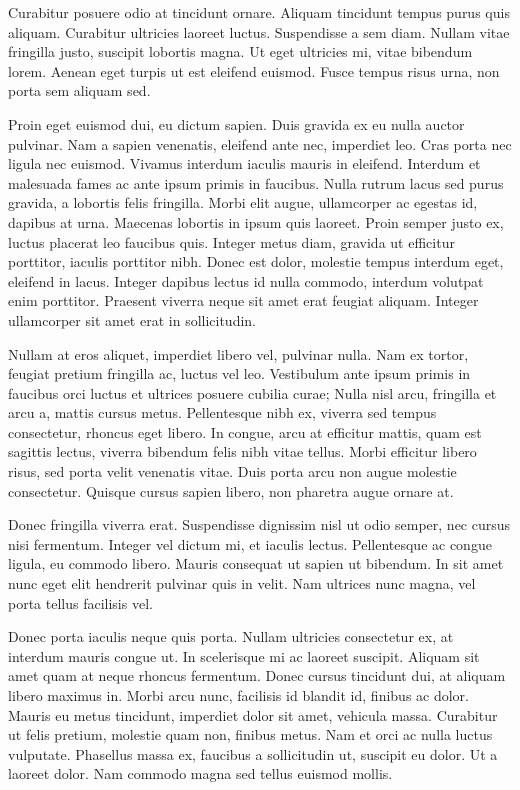 Curabitur posuere odio at tincidunt ornare. Aliquam tincidunt tempus purus quis
aliquam. Curabitur ultricies laoreet luctus. Suspendisse a sem diam. Nullam
vitae fringilla justo, suscipit lobortis magna. Ut eget ultricies mi, vitae
bibendum lorem. Aenean eget turpis ut est eleifend euismod. Fusce tempus risus
urna, non porta sem aliquam sed.

Proin eget euismod dui, eu dictum sapien. Duis gravida ex eu nulla auctor
pulvinar. Nam a sapien venenatis, eleifend ante nec, imperdiet leo. Cras porta
nec ligula nec euismod. Vivamus interdum iaculis mauris in eleifend. Interdum
et malesuada fames ac ante ipsum primis in faucibus. Nulla rutrum lacus sed
purus gravida, a lobortis felis fringilla. Morbi elit augue, ullamcorper ac
egestas id, dapibus at urna. Maecenas lobortis in ipsum quis laoreet. Proin
semper justo ex, luctus placerat leo faucibus quis. Integer metus diam, gravida
ut efficitur porttitor, iaculis porttitor nibh. Donec est dolor, molestie
tempus interdum eget, eleifend in lacus. Integer dapibus lectus id nulla
commodo, interdum volutpat enim porttitor. Praesent viverra neque sit amet erat
feugiat aliquam. Integer ullamcorper sit amet erat in sollicitudin.

Nullam at eros aliquet, imperdiet libero vel, pulvinar nulla. Nam ex tortor,
feugiat pretium fringilla ac, luctus vel leo. Vestibulum ante ipsum primis in
faucibus orci luctus et ultrices posuere cubilia curae; Nulla nisl arcu,
fringilla et arcu a, mattis cursus metus. Pellentesque nibh ex, viverra sed
tempus consectetur, rhoncus eget libero. In congue, arcu at efficitur mattis,
quam est sagittis lectus, viverra bibendum felis nibh vitae tellus. Morbi
efficitur libero risus, sed porta velit venenatis vitae. Duis porta arcu non
augue molestie consectetur. Quisque cursus sapien libero, non pharetra augue
ornare at.

Donec fringilla viverra erat. Suspendisse dignissim nisl ut odio semper, nec
cursus nisi fermentum. Integer vel dictum mi, et iaculis lectus. Pellentesque
ac congue ligula, eu commodo libero. Mauris consequat ut sapien ut bibendum. In
sit amet nunc eget elit hendrerit pulvinar quis in velit. Nam ultrices nunc
magna, vel porta tellus facilisis vel.

Donec porta iaculis neque quis porta. Nullam ultricies consectetur ex, at
interdum mauris congue ut. In scelerisque mi ac laoreet suscipit. Aliquam sit
amet quam at neque rhoncus fermentum. Donec cursus tincidunt dui, at aliquam
libero maximus in. Morbi arcu nunc, facilisis id blandit id, finibus ac dolor.
Mauris eu metus tincidunt, imperdiet dolor sit amet, vehicula massa. Curabitur
ut felis pretium, molestie quam non, finibus metus. Nam et orci ac nulla luctus
vulputate. Phasellus massa ex, faucibus a sollicitudin ut, suscipit eu dolor.
Ut a laoreet dolor. Nam commodo magna sed tellus euismod mollis.


